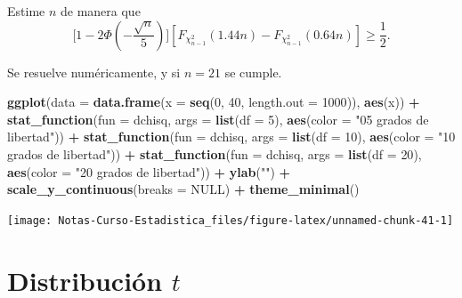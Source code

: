 \documentclass[
  12pt,
]{book}
\newenvironment{Shaded}{\begin{snugshade}}{\end{snugshade}}
\newcommand{\DataTypeTok}[1]{\textcolor[rgb]{0.13,0.29,0.53}{#1}}
\newcommand{\DecValTok}[1]{\textcolor[rgb]{0.00,0.00,0.81}{#1}}
\newcommand{\KeywordTok}[1]{\textcolor[rgb]{0.13,0.29,0.53}{\textbf{#1}}}
\newcommand{\NormalTok}[1]{#1}
\newcommand{\OperatorTok}[1]{\textcolor[rgb]{0.81,0.36,0.00}{\textbf{#1}}}
\newcommand{\OtherTok}[1]{\textcolor[rgb]{0.56,0.35,0.01}{#1}}
\newcommand{\StringTok}[1]{\textcolor[rgb]{0.31,0.60,0.02}{#1}}
\begin{document}
Estime \(n\) de manera que
\[\bigg[1-2\Phi\left(-\dfrac{\sqrt n}{5}\right)\bigg][F_{\chi^2_{n-1}}(1.44n)-F_{\chi^2_{n-1}}(0.64n)] \geq \dfrac 12.\]

Se resuelve numéricamente, y si \(n=21\) se cumple.

\begin{Shaded}
\begin{Highlighting}[]
\KeywordTok{ggplot}\NormalTok{(}\DataTypeTok{data =} \KeywordTok{data.frame}\NormalTok{(}\DataTypeTok{x =} \KeywordTok{seq}\NormalTok{(}\DecValTok{0}\NormalTok{, }\DecValTok{40}\NormalTok{, }\DataTypeTok{length.out =} \DecValTok{1000}\NormalTok{)), }
    \KeywordTok{aes}\NormalTok{(x)) }\OperatorTok{+}\StringTok{ }\KeywordTok{stat\_function}\NormalTok{(}\DataTypeTok{fun =}\NormalTok{ dchisq, }\DataTypeTok{args =} \KeywordTok{list}\NormalTok{(}\DataTypeTok{df =} \DecValTok{5}\NormalTok{), }
    \KeywordTok{aes}\NormalTok{(}\DataTypeTok{color =} \StringTok{"05 grados de libertad"}\NormalTok{)) }\OperatorTok{+}\StringTok{ }\KeywordTok{stat\_function}\NormalTok{(}\DataTypeTok{fun =}\NormalTok{ dchisq, }
    \DataTypeTok{args =} \KeywordTok{list}\NormalTok{(}\DataTypeTok{df =} \DecValTok{10}\NormalTok{), }\KeywordTok{aes}\NormalTok{(}\DataTypeTok{color =} \StringTok{"10 grados de libertad"}\NormalTok{)) }\OperatorTok{+}\StringTok{ }
\StringTok{    }\KeywordTok{stat\_function}\NormalTok{(}\DataTypeTok{fun =}\NormalTok{ dchisq, }\DataTypeTok{args =} \KeywordTok{list}\NormalTok{(}\DataTypeTok{df =} \DecValTok{20}\NormalTok{), }
        \KeywordTok{aes}\NormalTok{(}\DataTypeTok{color =} \StringTok{"20 grados de libertad"}\NormalTok{)) }\OperatorTok{+}\StringTok{ }\KeywordTok{ylab}\NormalTok{(}\StringTok{""}\NormalTok{) }\OperatorTok{+}\StringTok{ }
\StringTok{    }\KeywordTok{scale\_y\_continuous}\NormalTok{(}\DataTypeTok{breaks =} \OtherTok{NULL}\NormalTok{) }\OperatorTok{+}\StringTok{ }\KeywordTok{theme\_minimal}\NormalTok{()}
\end{Highlighting}
\end{Shaded}

\begin{center}\texttt{[image: Notas-Curso-Estadistica\_files/figure-latex/unnamed-chunk-41-1]} \end{center}

\hypertarget{distribuciuxf3n-t}{%
\section{\texorpdfstring{Distribución \(t\)}{Distribución t}}\label{distribuciuxf3n-t}}
\end{document}
